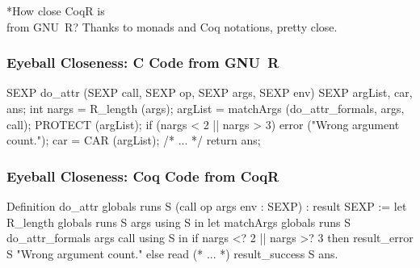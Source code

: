 \documentclass{beamer}
\begin{document}
\sectionframe**{How close CoqR is\\from GNU~R?}{
    \vfill
    \centering{}
    \textcolor{DarkPlum}{Thanks to monads and Coq notations, pretty close.}
}

\begin{frame}[fragile]
    \frametitle{Eyeball Closeness: C Code from GNU~R}

\begin{changemargin}{-5mm}{-5mm}
\begin{ccode}
SEXP do_attr
    (SEXP call, SEXP op, SEXP args, SEXP env){
  SEXP argList, car, ans;
  int nargs = R_length (args);
  argList =
    matchArgs (do_attr_formals, args, call);
  PROTECT (argList);
  if (nargs < 2 || nargs > 3)
    error ("Wrong argument count.");
  car = CAR (argList);
  /* ... */
  return ans;
}
\end{ccode}
\end{changemargin}

\end{frame}

\begin{frame}[fragile]
    \frametitle{Eyeball Closeness: Coq Code from CoqR}

\begin{changemargin}{-5mm}{-5mm}
\begin{coqcode}
Definition do_attr globals runs S
    (call op args env : SEXP) : result SEXP :=
  let%
    R_length globals runs S args using S in
  let%
    matchArgs globals runs S
      do_attr_formals args call using S in
  if nargs <? 2 || nargs >? 3 then
    result_error S "Wrong argument count."
  else
    read%
    (* ... *)
    result_success S ans.
\end{coqcode}
\end{changemargin}

\end{frame}
\end{document}
